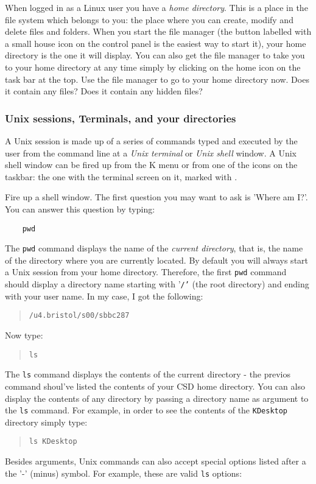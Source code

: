 \documentclass{article}
\newcommand{\fname}[1]{\texttt{#1}}
\begin{document}
When logged in as a Linux user you have a \emph{home directory}.
This is a place in the file system which belongs to you: the place where you can create, modify and delete files and folders. When you start the file manager (the button labelled with a small house icon on the control panel is the easiest way to start it), your home directory is the one it will display. You can also get the file manager to take you to your home directory at any time simply by clicking on the home icon on the task bar at the top.
Use the file manager to go to your home directory now.
Does it contain any files? Does it contain any hidden files?



\subsubsection*{Unix sessions, Terminals, and your directories}

A Unix session is made up of a series of commands typed and executed by the user from the command line at a \emph{Unix terminal} or \emph{Unix shell} window. A Unix shell window can be fired up from the K menu or from one of the icons  on the taskbar: the one with the terminal screen on it, marked with .

Fire up a shell window. The first question you may want to ask is 'Where am I?'. You can answer this question by typing:
\begin{verbatim}
    pwd
\end{verbatim}
The {\tt pwd} command displays the name of the \emph{current directory}, that is, the name of the directory where you are currently located. By default you will always start a Unix session from your home directory. Therefore, the first {\tt pwd} command should display a directory name  starting with '{\tt /'} (the root directory) and ending with your user name. In my case, I got the following:
\begin{quote}
{\tt /u4.bristol/s00/sbbc287}
\end{quote}
Now type:
\begin{quote}
{\tt ls} 
\end{quote}
The {\tt ls} command displays the contents of the current directory -  the previos command shoul've listed the contents of your CSD home directory. You can also display the contents of any directory by passing a directory name as argument to the {\tt ls} command. For example, in order to see the contents of the {\tt KDesktop} directory simply type:
\begin{quote}
{\tt ls KDesktop} 
\end{quote}
Besides arguments, Unix commands can also accept special options listed after a the '-' (minus) symbol. For example, these are valid {\tt ls} options:
\end{document}
